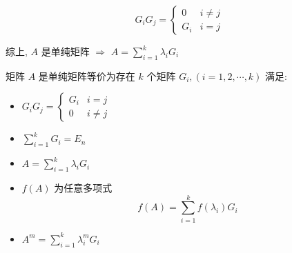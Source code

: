 \begin{anymark}[证明]
	$$G_{i}G_{j} = 
	\begin{cases}
		0 & i \neq j\\
		G_{i} & i = j
	\end{cases}$$

	综上, $A$ 是单纯矩阵 $\Rightarrow$ $A = \sum\limits_{i = 1}^{k} \lambda_{i}G_{i}$
\end{anymark}

\begin{proposition}
	矩阵 $A$ 是单纯矩阵等价为存在 $k$ 个矩阵 $G_{i},(i=1,2,\cdots,k)$ 满足:  
	\begin{itemize}
		\item $G_{i}G_{j} = \begin{cases}
			G_{i} & i = j\\
			0 & i\neq j
		\end{cases}$
		\item $\sum\limits_{i=1}^{k}G_{i} = E_{n}$
		\item $A = \sum\limits_{i=1}^{k}\lambda_{i}G_{i}$
		\item $f(A)$ 为任意多项式 $$f(A)=\sum\limits_{i=1}^{k}f(\lambda_{i})G_{i}$$
		\item $A^{m} = \sum\limits_{i=1}^{k}\lambda_{i}^{m}G_{i}$
	\end{itemize}
\end{proposition}
